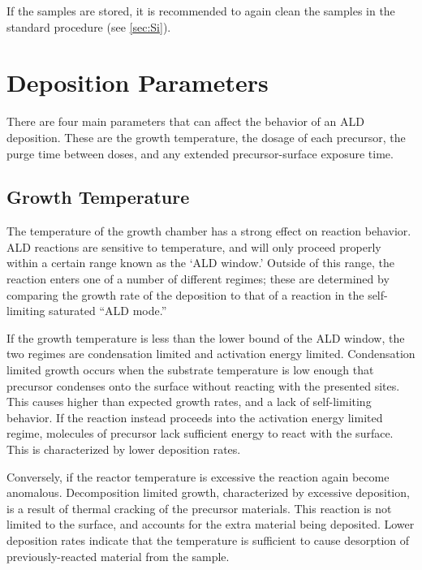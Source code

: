 If the samples are stored, it is recommended to again clean the samples in the standard procedure (see \vref{sec:Si}).


\section{Deposition Parameters}
\label{sec:SampFab-DepParams}

There are four main parameters that can affect the behavior of an ALD deposition.  These are the growth temperature, the dosage of each precursor, the purge time between doses, and any extended precursor-surface exposure time. 


\subsection{Growth Temperature}

The temperature of the growth chamber has a strong effect on reaction behavior. ALD reactions are sensitive to temperature, and will only proceed properly within a certain range known as the `ALD window.' Outside of this range, the reaction enters one of a number of different regimes; these are determined by comparing the growth rate of the deposition to that of a reaction in the self-limiting saturated ``ALD mode.''\cite{ALD-Handbook,Leskela_2002,lim_atomic_2003,Ritala_ALD_2003} 

If the growth temperature is less than the lower bound of the ALD window, the two regimes are condensation limited and activation energy limited. Condensation limited growth occurs when the substrate temperature is low enough that precursor condenses onto the surface without reacting with the presented sites. This causes higher than expected growth rates, and a lack of self-limiting behavior. If the reaction instead proceeds into the activation energy limited regime, molecules of precursor lack sufficient energy to react with the surface. This is characterized by lower deposition rates.\cite{ALD-Handbook,Leskela_2002} 

Conversely, if the reactor temperature is excessive the reaction again become anomalous. Decomposition limited growth, characterized by excessive deposition, is a result of thermal cracking of the precursor materials. This reaction is not limited to the surface, and accounts for the extra material being deposited. Lower deposition rates indicate that the temperature is sufficient to cause desorption of previously-reacted material from the sample.\cite{ALD-Handbook,Ritala_ALD_2003} 

